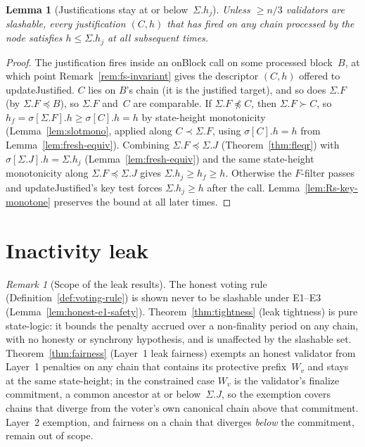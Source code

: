 \ifx\litemode\undefined\documentclass{article}\fi
\newcommand{\onBlock}{\textsf{onBlock}\xspace}
\newcommand{\updateJustified}{\textsf{updateJustified}\xspace}
\theoremstyle{plain}
\newtheorem{lemma}{Lemma}
\theoremstyle{definition}
\theoremstyle{remark}
\newtheorem{remark}[theorem]{Remark}
\begin{document}
\begin{lemma}[Justifications stay at or below~$\Sigma.h_j$]\label{lem:no-high-just}
Unless $\geq n/3$ validators are slashable, every justification $(C, h)$ that has fired on any chain processed by the node satisfies $h \leq \Sigma.h_j$ at all subsequent times.
\end{lemma}

\begin{proof}
The justification fires inside an \onBlock call on some processed block~$B$, at which point Remark~\ref{rem:fs-invariant} gives the descriptor $(C, h)$ offered to \updateJustified.
$C$ lies on $B$'s chain (it is the justified target), and so does $\Sigma.F$ (by $\Sigma.F \preceq B$), so $\Sigma.F$ and~$C$ are comparable.
If $\Sigma.F \not\preceq C$, then $\Sigma.F \succ C$, so $h_f = \sigma[\Sigma.F].h \geq \sigma[C].h = h$ by state-height monotonicity (Lemma~\ref{lem:slotmono}, applied along $C \prec \Sigma.F$, using $\sigma[C].h = h$ from Lemma~\ref{lem:fresh-equiv}).
Combining $\Sigma.F \preceq \Sigma.J$ (Theorem~\ref{thm:fleqr}) with $\sigma[\Sigma.J].h = \Sigma.h_j$ (Lemma~\ref{lem:fresh-equiv}) and the same state-height monotonicity along $\Sigma.F \preceq \Sigma.J$ gives $\Sigma.h_j \geq h_f \geq h$.
Otherwise the $F$-filter passes and \updateJustified's key test forces $\Sigma.h_j \geq h$ after the call.
Lemma~\ref{lem:Rs-key-monotone} preserves the bound at all later times.
\end{proof}

\section{Inactivity leak}\label{sec:leak}

\begin{remark}[Scope of the leak results]\label{rem:leak-pending}
The honest voting rule (Definition~\ref{def:voting-rule}) is shown never to be slashable under E1--E3 (Lemma~\ref{lem:honest-e1-safety}).
Theorem~\ref{thm:tightness} (leak tightness) is pure state-logic: it bounds the penalty accrued over a non-finality period on any chain, with no honesty or synchrony hypothesis, and is unaffected by the slashable set.
Theorem~\ref{thm:fairness} (Layer~1 leak fairness) exempts an honest validator from Layer~1 penalties on any chain that contains its protective prefix~$W_v$ and stays at the same state-height; in the constrained case $W_v$ is the validator's finalize commitment, a common ancestor at or below~$\Sigma.J$, so the exemption covers chains that diverge from the voter's own canonical chain above that commitment.
Layer~2 exemption, and fairness on a chain that diverges \emph{below} the commitment, remain out of scope.
\end{remark}
\end{document}
